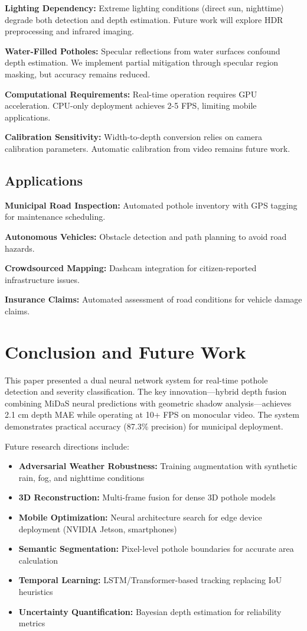 \documentclass[conference]{IEEEtran}
\begin{document}
\textbf{Lighting Dependency:} Extreme lighting conditions (direct sun, nighttime) degrade both detection and depth estimation. Future work will explore HDR preprocessing and infrared imaging.

\textbf{Water-Filled Potholes:} Specular reflections from water surfaces confound depth estimation. We implement partial mitigation through specular region masking, but accuracy remains reduced.

\textbf{Computational Requirements:} Real-time operation requires GPU acceleration. CPU-only deployment achieves 2-5 FPS, limiting mobile applications.

\textbf{Calibration Sensitivity:} Width-to-depth conversion relies on camera calibration parameters. Automatic calibration from video remains future work.

\subsection{Applications}

\textbf{Municipal Road Inspection:} Automated pothole inventory with GPS tagging for maintenance scheduling.

\textbf{Autonomous Vehicles:} Obstacle detection and path planning to avoid road hazards.

\textbf{Crowdsourced Mapping:} Dashcam integration for citizen-reported infrastructure issues.

\textbf{Insurance Claims:} Automated assessment of road conditions for vehicle damage claims.

\section{Conclusion and Future Work}

This paper presented a dual neural network system for real-time pothole detection and severity classification. The key innovation—hybrid depth fusion combining MiDaS neural predictions with geometric shadow analysis—achieves 2.1 cm depth MAE while operating at 10+ FPS on monocular video. The system demonstrates practical accuracy (87.3\% precision) for municipal deployment.

Future research directions include:

\begin{itemize}
    \item \textbf{Adversarial Weather Robustness:} Training augmentation with synthetic rain, fog, and nighttime conditions
    \item \textbf{3D Reconstruction:} Multi-frame fusion for dense 3D pothole models
    \item \textbf{Mobile Optimization:} Neural architecture search for edge device deployment (NVIDIA Jetson, smartphones)
    \item \textbf{Semantic Segmentation:} Pixel-level pothole boundaries for accurate area calculation
    \item \textbf{Temporal Learning:} LSTM/Transformer-based tracking replacing IoU heuristics
    \item \textbf{Uncertainty Quantification:} Bayesian depth estimation for reliability metrics
\end{itemize}
\end{document}
